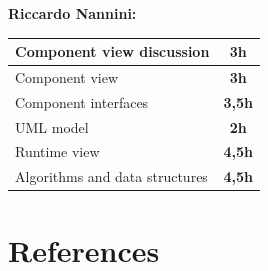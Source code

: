 \documentclass[]{article}
\begin{document}
		\medskip
		\textbf{\large Riccardo Nannini:} \\ \newline
		\begin{tabular}{|l|c|}
			\hline
			\begin{minipage}[t]{10cm}
				Component view discussion
			\end{minipage} 
			& \textbf{3h} \\ \hline
			\rowcolor[HTML]{DCDCDC} 
			Component view & \textbf{3h} \\ \hline
			Component interfaces & \textbf{3,5h} \\ \hline
			\rowcolor[HTML]{DCDCDC} 
			UML model & \textbf{2h} \\ \hline
			Runtime view & \textbf{4,5h} \\ \hline
			\rowcolor[HTML]{DCDCDC} 
			Algorithms and data structures & \textbf{4,5h} \\ \hline
		\end{tabular}
	
			
			\section{References}	
			
			
	

				
\end{document}
